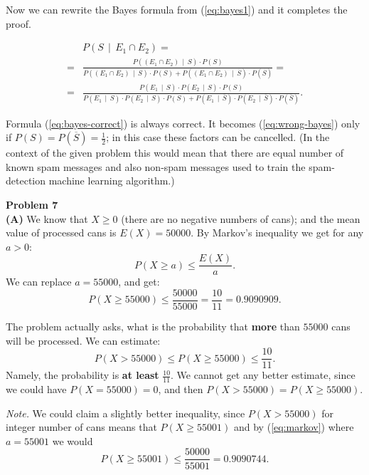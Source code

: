 \documentclass[jou]{apa6}
\begin{document}
Now we can rewrite the Bayes formula from (\ref{eq:bayes1}) and it completes the proof.

{\footnotesize
\begin{align}
 & P\left( S \,\mid\, E_1 \cap E_2 \right) = \nonumber \\
= & \frac{P((E_1 \cap E_2) \,\mid\, S) \cdot P(S)}{P((E_1 \cap E_2) \,\mid\, S) \cdot P(S)
+ P((E_1 \cap E_2) \,\mid\, \overline{S}) \cdot P(\overline{S})} = \nonumber \\
= & \frac{P(E_1 \,\mid\, S) \cdot P(E_2 \,\mid\, S) \cdot P(S)}{P(E_1 \,\mid\, S) \cdot P(E_2 \,\mid\, S) \cdot P(S)
+ P(E_1 \,\mid\, \overline{S} ) \cdot P(E_2 \,\mid\, \overline{S} ) \cdot P(\overline{S})}. \label{eq:bayes-correct}
\end{align}
}

Formula (\ref{eq:bayes-correct}) is always correct. It becomes (\ref{eq:wrong-bayes}) only 
if $P(S) = P(\overline{S}) = \frac{1}{2}$; in this case these factors can be cancelled.
(In the context of the given problem this would mean that there are equal number of 
known spam messages and also non-spam messages used to train the spam-detection
machine learning algorithm.)






\vspace{8pt}
{\bf Problem 7}\\
{\bf (A)} We know that $X \geq 0$ (there are no negative numbers of cans); 
and the mean value of processed cans is $E(X) = 50000$. 
By Markov's inequality we get for any $a>0$:
\begin{equation}
\label{eq:markov}
P(X \geq a) \leq \frac{E(X)}{a}.
\end{equation}
We can replace $a = 55000$, and get: 
$$P(X \geq 55000) \leq \frac{50000}{55000} = \frac{10}{11} = 0.9090909.$$

The problem actually asks, what is the probability that {\bf more} than 
$55000$ cans will be processed. We can estimate:
$$P(X > 55000) \leq P(X \geq 55000) \leq \frac{10}{11}.$$
Namely, the probability is {\bf at least} $\frac{10}{11}$. 
We cannot get any better estimate, since we could 
have $P(X = 55000) = 0$, and then $P(X > 55000) = P(X \geq 55000)$. 

{\em Note.} We could 
claim a slightly better inequality, since $P(X > 55000)$
for integer number of cans means that $P(X \geq 55001)$ and
by (\ref{eq:markov}) where $a = 55001$ we would 
$$P(X \geq 55001) \leq \frac{50000}{55001} = 0.9090744.$$
\end{document}
